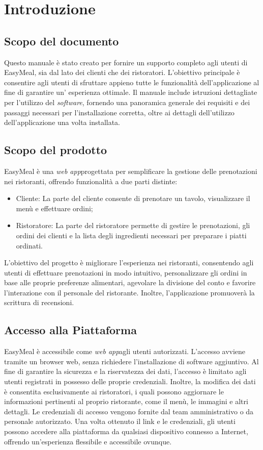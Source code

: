 \section{Introduzione}
\subsection{Scopo del documento}
Questo manuale è stato creato per fornire un supporto completo agli utenti di EasyMeal, sia dal lato dei clienti che dei ristoratori. 
L'obiettivo principale è consentire agli utenti di sfruttare appieno tutte le funzionalità dell'applicazione al fine di garantire un'
esperienza ottimale. Il manuale include istruzioni dettagliate per l'utilizzo del \textit{software}, fornendo una panoramica generale dei requisiti 
e dei passaggi necessari per l'installazione corretta, oltre ai dettagli dell'utilizzo dell'applicazione una volta installata.



\subsection{Scopo del prodotto}
EasyMeal è una \textit{web app}\g progettata per semplificare la gestione delle prenotazioni nei ristoranti, offrendo funzionalità 
a due parti distinte: 
\begin{itemize}
	\item Cliente\g: La parte del cliente consente di prenotare un tavolo, visualizzare il menù e effettuare 
	ordini\g ;
	\item Ristoratore\g : La parte del ristoratore permette di gestire le prenotazioni, gli ordini dei clienti e la lista degli ingredienti 
	necessari per preparare i piatti ordinati.
\end{itemize}

L'obiettivo del progetto è migliorare l'esperienza nei ristoranti, consentendo agli utenti di effettuare prenotazioni 
in modo intuitivo, personalizzare gli ordini in base alle proprie preferenze alimentari, agevolare la divisione del conto e favorire 
l'interazione con il personale del ristorante. Inoltre, l'applicazione promuoverà la scrittura di recensioni.



\subsection{Accesso alla Piattaforma}
EasyMeal è accessibile come \textit{web app}\g agli utenti autorizzati. L'accesso avviene tramite un browser web, senza richiedere 
l'installazione di software aggiuntivo.
Al fine di garantire la sicurezza e la riservatezza dei dati, l'accesso è limitato agli utenti 
registrati in possesso delle proprie credenziali. Inoltre, la modifica dei dati è consentita esclusivamente ai ristoratori, i quali possono 
aggiornare le informazioni pertinenti al proprio ristorante, come il menù, le immagini e altri dettagli. Le credenziali di accesso vengono 
fornite dal team amministrativo o da personale autorizzato. Una volta ottenuto il link e le credenziali, gli utenti possono accedere alla 
piattaforma da qualsiasi dispositivo connesso a Internet, offrendo un'esperienza flessibile e accessibile ovunque.


